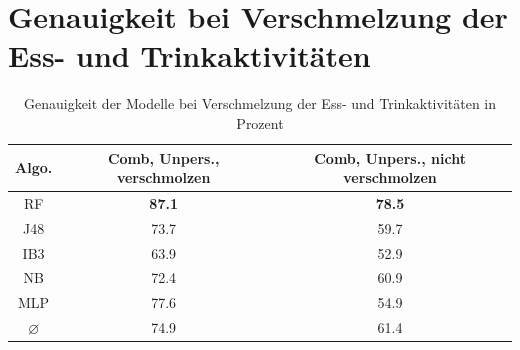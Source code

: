 \section{Genauigkeit bei Verschmelzung der Ess- und Trinkaktivitäten}
\begin{table}
\centering
\begin{tabular}{|c|c|c|}
	\hline 
	\textbf{Algo.} & \textbf{Comb, Unpers., verschmolzen} & \textbf{Comb, Unpers., nicht verschmolzen} \\ 
	\hline 
	RF & \textbf{87.1} &  \textbf{78.5} \\ 
	J48 & 73.7 &  59.7 \\ 
	IB3 & 63.9 &  52.9  \\ 
	NB & 72.4 & 60.9  \\ 
	MLP & 77.6  & 54.9 \\ 
	\hline 
	$\varnothing$ & 74.9 & 61.4  \\ 
	\hline
\end{tabular} 
\caption{Genauigkeit der Modelle bei Verschmelzung der Ess- und Trinkaktivitäten in Prozent}
\label{tab:accuracy-merge-eating}
\end{table}
